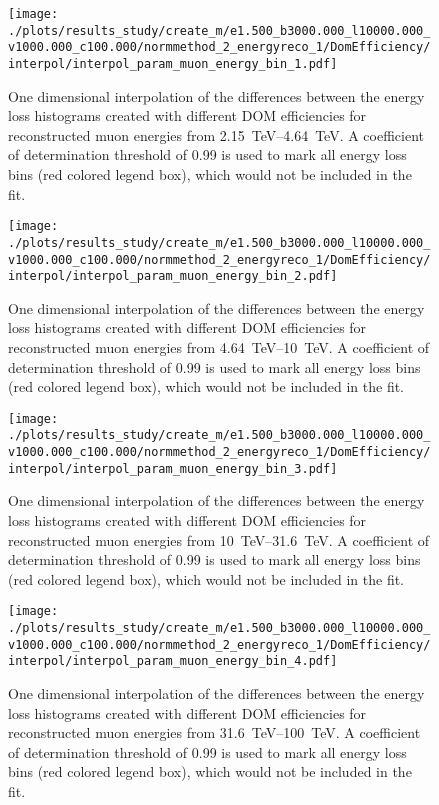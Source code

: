 \begin{figure}[H]
    \centering
    \texttt{[image: ./plots/results\_study/create\_m/e1.500\_b3000.000\_l10000.000\_v1000.000\_c100.000/normmethod\_2\_energyreco\_1/DomEfficiency/interpol/interpol\_param\_muon\_energy\_bin\_1.pdf]}
    \caption{One dimensional interpolation of the differences between the energy loss histograms created with different DOM efficiencies for reconstructed muon energies from \SIrange{2.15}{4.64}{TeV}. A coefficient of determination threshold of \num{0.99} is used to mark all energy loss bins (red colored legend box), which would not be included in the fit.}
    \label{fig:study_1d_interpol_mu1_nn_low_eff}
\end{figure}

\begin{figure}[H]
    \centering
    \texttt{[image: ./plots/results\_study/create\_m/e1.500\_b3000.000\_l10000.000\_v1000.000\_c100.000/normmethod\_2\_energyreco\_1/DomEfficiency/interpol/interpol\_param\_muon\_energy\_bin\_2.pdf]}
    \caption{One dimensional interpolation of the differences between the energy loss histograms created with different DOM efficiencies for reconstructed muon energies from \SIrange{4.64}{10}{TeV}. A coefficient of determination threshold of \num{0.99} is used to mark all energy loss bins (red colored legend box), which would not be included in the fit.}
    \label{fig:study_1d_interpol_mu2_nn_low_eff}
\end{figure}

\begin{figure}[H]
    \centering
    \texttt{[image: ./plots/results\_study/create\_m/e1.500\_b3000.000\_l10000.000\_v1000.000\_c100.000/normmethod\_2\_energyreco\_1/DomEfficiency/interpol/interpol\_param\_muon\_energy\_bin\_3.pdf]}
    \caption{One dimensional interpolation of the differences between the energy loss histograms created with different DOM efficiencies for reconstructed muon energies from \SIrange{10}{31.6}{TeV}. A coefficient of determination threshold of \num{0.99} is used to mark all energy loss bins (red colored legend box), which would not be included in the fit.}
    \label{fig:study_1d_interpol_mu3_nn_low_eff}
\end{figure}

\begin{figure}[H]
    \centering
    \texttt{[image: ./plots/results\_study/create\_m/e1.500\_b3000.000\_l10000.000\_v1000.000\_c100.000/normmethod\_2\_energyreco\_1/DomEfficiency/interpol/interpol\_param\_muon\_energy\_bin\_4.pdf]}
    \caption{One dimensional interpolation of the differences between the energy loss histograms created with different DOM efficiencies for reconstructed muon energies from \SIrange{31.6}{100}{TeV}. A coefficient of determination threshold of \num{0.99} is used to mark all energy loss bins (red colored legend box), which would not be included in the fit.}
    \label{fig:study_1d_interpol_mu4_nn_low_eff}
\end{figure}


